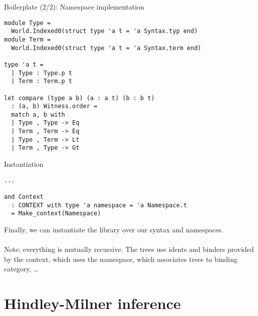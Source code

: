 \documentclass{beamer}          %
\begin{document}
\begin{frame}[fragile]{Boilerplate (2/2): Namespace implementation}

\begin{lstlisting}
module Type =
  World.Indexed0(struct type 'a t = 'a Syntax.typ end)
module Term =
  World.Indexed0(struct type 'a t = 'a Syntax.term end)

type 'a t =
  | Type : Type.p t
  | Term : Term.p t

let compare (type a b) (a : a t) (b : b t)
  : (a, b) Witness.order =
  match a, b with
  | Type , Type -> Eq
  | Term , Term -> Eq
  | Type , Term -> Lt
  | Term , Type -> Gt
\end{lstlisting}

\end{frame}

\begin{frame}[fragile]{Instantiation}

\begin{lstlisting}
...

and Context
  : CONTEXT with type 'a namespace = 'a Namespace.t
  = Make_context(Namespace)
\end{lstlisting}

Finally, we can instantiate the library over our syntax and namespaces. \\~\\

Note: everything is mutually recursive. The trees use idents and binders provided by the context, which uses the namespace, which associates trees to binding category, \ldots

\end{frame}

\section{Hindley-Milner inference}
\end{document}
